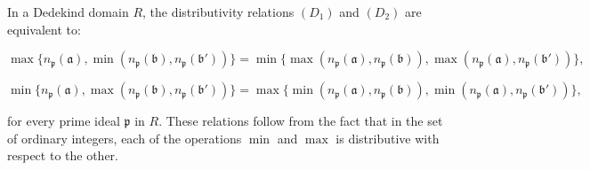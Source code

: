 In a Dedekind domain $R$, the distributivity relations $(D_1)$ and $(D_2)$ are equivalent to:

$$\max \{n_{\mathfrak{p}}(\mathfrak{a}), \min (n_{\mathfrak{p}}(\mathfrak{b}), n_{\mathfrak{p}}(\mathfrak{b}'))\} = \min \{ \max (n_{\mathfrak{p}}(\mathfrak{a}), n_{\mathfrak{p}}(\mathfrak{b})), \max (n_{\mathfrak{p}}(\mathfrak{a}), n_{\mathfrak{p}}(\mathfrak{b}')) \},$$

$$\min \{n_{\mathfrak{p}}(\mathfrak{a}), \max (n_{\mathfrak{p}}(\mathfrak{b}), n_{\mathfrak{p}}(\mathfrak{b}'))\} = \max \{ \min (n_{\mathfrak{p}}(\mathfrak{a}), n_{\mathfrak{p}}(\mathfrak{b})), \min (n_{\mathfrak{p}}(\mathfrak{a}), n_{\mathfrak{p}}(\mathfrak{b}')) \},$$

for every prime ideal $\mathfrak{p}$ in $R$. These relations follow from the fact that in the set of ordinary integers, each of the operations $\min$ and $\max$ is distributive with respect to the other.
